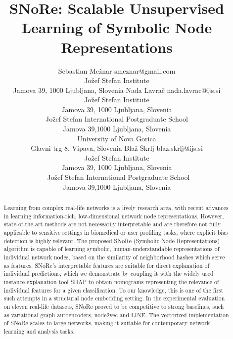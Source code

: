 \documentclass[twoside,11pt]{article}
\begin{document}
\title{SNoRe: Scalable Unsupervised Learning of Symbolic Node Representations}

\author{\name Sebastian Me\v{z}nar \email smeznar@gmail.com \\
       \addr Jo\v{z}ef Stefan Institute\\
       Jamova 39, 1000 Ljubljana, Slovenia
       \AND
       \name Nada Lavra\v{c} \email nada.lavrac@ijs.si  \\
       \addr Jo\v{z}ef Stefan Institute\\
       Jamova 39, 1000 Ljubljana, Slovenia \\
       \addr Jo\v{z}ef Stefan International Postgraduate School \\
       Jamova 39,1000 Ljubljana, Slovenia \\
       \addr University of Nova Gorica \\
        Glavni trg 8, Vipava, Slovenia
       \AND
       \name Bla\v{z} \v{S}krlj \email blaz.skrlj@ijs.si   \\
       \addr Jo\v{z}ef Stefan Institute\\
       Jamova 39, 1000 Ljubljana, Slovenia \\\
       \addr Jo\v{z}ef Stefan International Postgraduate School \\
       Jamova 39,1000 Ljubljana, Slovenia}


\maketitle

\begin{abstract}
Learning from complex real-life networks is a lively research area, with recent advances in learning information-rich, low-dimensional network node representations. However, state-of-the-art methods are not necessarily interpretable and are therefore not fully applicable to sensitive settings in biomedical or user profiling tasks, where explicit bias detection is highly relevant. The proposed SNoRe (Symbolic Node Representations) algorithm is capable of learning symbolic, human-understandable representations of  individual network nodes, based on the similarity of neighborhood hashes which serve as features.
SNoRe's interpretable features are suitable for direct explanation of individual predictions, which we demonstrate by coupling it with the widely used instance explanation tool SHAP to obtain nomograms representing the relevance of individual features for a given classification. To our knowledge, this is one of the first such attempts in a structural node embedding setting. In the experimental evaluation on eleven real-life datasets, SNoRe proved to be competitive to strong baselines, such as variational graph autoencoders, node2vec and LINE. The vectorized implementation of SNoRe scales to large networks, making it suitable for contemporary network learning and analysis tasks.
\end{abstract}
\end{document}

